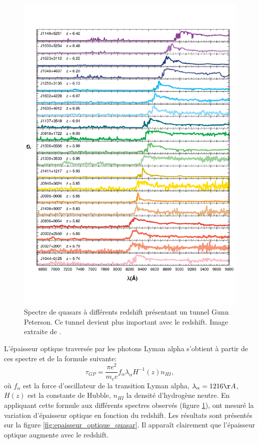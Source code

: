 
\begin{figure}
        \includegraphics[width=.95\linewidth]{img/01/quasar_spectre.pdf} 
        \caption[Spectre de quasars]{Spectre de quasars à différents redshift présentant un tunnel Gunn Peterson.
        Ce tunnel devient plus important avec le redshift.
		Image extraite de \cite{fan_constraining_2006}.
 		\label{fig:spectre_quasar}}
\end{figure}



L’épaisseur optique traversée par les photons Lyman alpha s'obtient à partir de ces spectre et de la formule suivante:
\begin{equation}
\tau_{GP} = \frac{\pi e^2}{m_e c} f_\alpha \lambda_\alpha H^{-1}(z) n_{HI},
\end{equation}
où $f_\alpha$ est la force d'oscillateur de la transition Lyman alpha, $\lambda_\alpha = 1216 \AA$, $H(z)$ est la constante de Hubble, $n_{HI}$ la densité d'hydrogène neutre.
En appliquant cette formule aux différents spectres observés (figure \ref{fig:spectre_quasar}), \cite{fan_constraining_2006} ont mesuré la variation d'épaisseur optique en fonction du redshift.
Les résultats sont présentés sur la figure \ref{fig:epaisseur_optique_quasar}.
Il apparaît clairement que l'épaisseur optique augmente avec le redshift.




